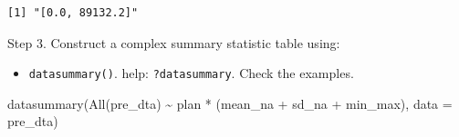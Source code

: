 \documentclass[
  letterpaper,
  DIV=11,
  numbers=noendperiod]{scrartcl}
\newenvironment{Shaded}{\begin{snugshade}}{\end{snugshade}}
\newcommand{\AttributeTok}[1]{\textcolor[rgb]{0.40,0.45,0.13}{#1}}
\newcommand{\FunctionTok}[1]{\textcolor[rgb]{0.28,0.35,0.67}{#1}}
\newcommand{\NormalTok}[1]{\textcolor[rgb]{0.00,0.23,0.31}{#1}}
\newcommand{\SpecialCharTok}[1]{\textcolor[rgb]{0.37,0.37,0.37}{#1}}
\providecommand{\tightlist}{%
  \setlength{\itemsep}{0pt}\setlength{\parskip}{0pt}}\usepackage{longtable,booktabs,array}
\begin{document}
\begin{Shaded}
\end{Shaded}

\begin{verbatim}
[1] "[0.0, 89132.2]"
\end{verbatim}

Step 3. Construct a complex summary statistic table using:

\begin{itemize}
\tightlist
\item
  \texttt{datasummary()}. help: \texttt{?datasummary}. Check the
  examples.
\end{itemize}

\begin{Shaded}
\begin{Highlighting}[]
\FunctionTok{datasummary}\NormalTok{(}\FunctionTok{All}\NormalTok{(pre\_dta) }\SpecialCharTok{\textasciitilde{}}\NormalTok{ plan }\SpecialCharTok{*}\NormalTok{ (mean\_na }\SpecialCharTok{+}\NormalTok{ sd\_na }\SpecialCharTok{+}\NormalTok{ min\_max), }\AttributeTok{data =}\NormalTok{ pre\_dta)}
\end{Highlighting}
\end{Shaded}
\end{document}
